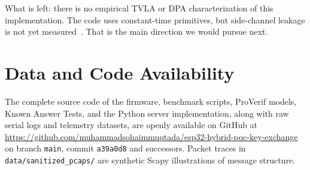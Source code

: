 \documentclass[journal, 10pt]{IEEEtran}
\begin{document}
What is left: there is no empirical TVLA or DPA characterization of this implementation. The code uses constant-time primitives, but side-channel leakage is not yet measured~\cite{b18,b40}. That is the main direction we would pursue next.


\section*{Data and Code Availability}
The complete source code of the firmware, benchmark scripts, ProVerif models, Known Answer Tests, and the Python server implementation, along with raw serial logs and telemetry datasets, are openly available on GitHub at \url{https://github.com/muhammadsohaimmuqtada/esp32-hybrid-pqc-key-exchange} on branch \texttt{main}, commit \texttt{a39a0d8} and successors. Packet traces in \texttt{data/sanitized\_pcaps/} are synthetic Scapy illustrations of message structure.
\end{document}
